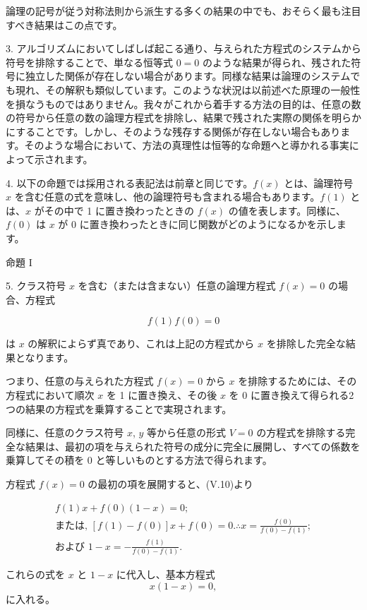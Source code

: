 \documentclass[a4paper,11pt,openany]{ltjsbook}
\begin{document}
論理の記号が従う対称法則から派生する多くの結果の中でも、おそらく最も注目すべき結果はこの点です。

3. アルゴリズムにおいてしばしば起こる通り、与えられた方程式のシステムから符号を排除することで、単なる恒等式 $0 = 0$ のような結果が得られ、残された符号に独立した関係が存在しない場合があります。同様な結果は論理のシステムでも現れ、その解釈も類似しています。このような状況は以前述べた原理の一般性を損なうものではありません。我々がこれから着手する方法の目的は、任意の数の符号から任意の数の論理方程式を排除し、結果で残された実際の関係を明らかにすることです。しかし、そのような残存する関係が存在しない場合もあります。そのような場合において、方法の真理性は恒等的な命題へと導かれる事実によって示されます。

4. 以下の命題では採用される表記法は前章と同じです。$f(x)$ とは、論理符号 $x$ を含む任意の式を意味し、他の論理符号も含まれる場合もあります。$f(1)$ とは、$x$ がその中で 1 に置き換わったときの $f(x)$ の値を表します。同様に、$f(0)$ は $x$ が 0 に置き換わったときに同じ関数がどのようになるかを示します。

\textsc{命題 I}

5. クラス符号 $x$ を含む（または含まない）任意の論理方程式 $f(x) = 0$ の場合、方程式

\[
f(1)f(0)=0
\]

は $x$ の解釈によらず真であり、これは上記の方程式から $x$ を排除した完全な結果となります。

つまり、任意の与えられた方程式 $f(x) = 0$ から $x$ を排除するためには、その方程式において順次 $x$ を 1 に置き換え、その後 $x$ を 0 に置き換えて得られる2つの結果の方程式を乗算することで実現されます。

同様に、任意のクラス符号 $x$, $y$ 等から任意の形式 $V = 0$ の方程式を排除する完全な結果は、最初の項を与えられた符号の成分に完全に展開し、すべての係数を乗算してその積を 0 と等しいものとする方法で得られます。

方程式 $f(x) = 0$ の最初の項を展開すると、(V.10)より

\begin{eqnarray}
f(1)x + f(0)(1 - x) = 0; \nonumber \\
\textrm{または, }
[f(1) - f(0)]x + f(0) = 0.
\therefore x = \frac{f(0)}{f(0) - f(1)}; \nonumber\\
\textrm{および }
1 - x = -\frac{f(1)}{f(0) - f(1)}. \nonumber
\end{eqnarray}

これらの式を $x$ と $1 - x$ に代入し、基本方程式
\[ x(1 - x) = 0,
\]
に入れる。
\end{document}
